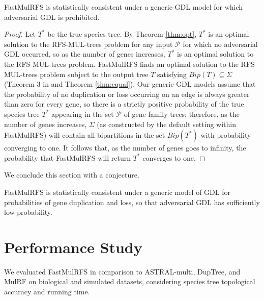 \begin{theorem}
FastMulRFS is statistically consistent under a generic GDL model for which adversarial GDL is prohibited.
\label{thm:main}

\end{theorem}
\begin{proof}
Let $T^*$ be the true species tree. 
By Theorem \ref{thm:opt}, $T^*$ is an optimal solution to the RFS-MUL-trees problem for any input $\mathcal{P}$ for which no adversarial GDL occurred, so as the number of genes increases, $T^*$ is an optimal solution to the RFS-MUL-trees problem.
FastMulRFS finds an optimal solution to the RFS-MUL-trees problem subject to the output tree $T$ satisfying $Bip(T) \subseteq \Sigma$ (Theorem 3 in \cite{vachaspati2015fastrfs} and Theorem \ref{thm:equal}).
Our generic GDL models assume that the probability of no duplication or loss occurring on an edge is always greater than zero for every gene, so there is a strictly positive probability of the true species tree $T^*$ appearing in the set $\mathcal{P}$ of gene family trees; therefore, as the number of genes increases, $\Sigma$ (as constructed by the default setting within FastMulRFS) will contain all bipartitions in the set $Bip(T^*)$ with probability converging to one.
It follows that, as the number of genes goes to infinity, the probability that FastMulRFS will return $T^*$ converges to one.
\end{proof}

We conclude this section with a conjecture.
\begin{conjecture}
\label{conj:1}
FastMulRFS is statistically consistent under a generic model of GDL for probabilities of gene duplication and loss, so that adversarial GDL has sufficiently low probability.
\end{conjecture}

\section{Performance Study}
\label{sec:fastmulrfs-study}
We evaluated FastMulRFS in comparison to ASTRAL-multi, DupTree, and MulRF on biological and simulated datasets, considering species tree topological accuracy and running time. 

